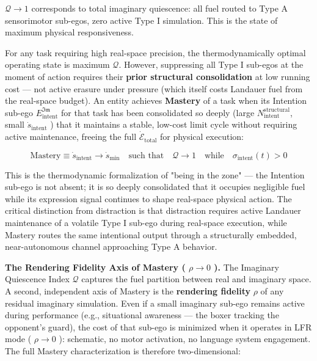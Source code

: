 \documentclass[11pt,a4paper]{article}
\theoremstyle{definition}
\theoremstyle{remark}
\begin{document}
$\mathcal{Q} \to 1$ corresponds to total imaginary quiescence: all fuel routed to Type A sensorimotor sub-egos, zero active Type I simulation. This is the state of maximum physical responsiveness.

For any task requiring high real-space precision, the thermodynamically optimal operating state is maximum $\mathcal{Q}$. However, suppressing all Type I sub-egos at the moment of action requires their \textbf{prior structural consolidation} at low running cost — not active erasure under pressure (which itself costs Landauer fuel from the real-space budget). An entity achieves \textbf{Mastery} of a task when its Intention sub-ego $E_{\text{intent}}^{\mathfrak{Im}}$ for that task has been consolidated so deeply (large $N_{\text{intent}}^{\text{structural}}$, small $\dot{s}_{\text{intent}}$ ) that it maintains a stable, low-cost limit cycle without requiring active maintenance, freeing the full $\dot{\mathcal{E}}_{\text{total}}$ for physical execution:


\begin{equation}
\boxed{\text{Mastery} \equiv \dot{s}_{\text{intent}} \to \dot{s}_{\text{min}} \quad \text{such that} \quad \mathcal{Q} \to 1 \quad \text{while} \quad \sigma_{\text{intent}}(t) > 0}
\end{equation}


This is the thermodynamic formalization of "being in the zone" — the Intention sub-ego is not absent; it is so deeply consolidated that it occupies negligible fuel while its expression signal continues to shape real-space physical action. The critical distinction from distraction is that distraction requires active Landauer maintenance of a volatile Type I sub-ego during real-space execution, while Mastery routes the same intentional output through a structurally embedded, near-autonomous channel approaching Type A behavior.

\textbf{The Rendering Fidelity Axis of Mastery ( $\rho \to 0$ ).} The Imaginary Quiescence Index $\mathcal{Q}$ captures the fuel partition between real and imaginary space. A second, independent axis of Mastery is the \textbf{rendering fidelity} $\rho$ of any residual imaginary simulation. Even if a small imaginary sub-ego remains active during performance (e.g., situational awareness — the boxer tracking the opponent's guard), the cost of that sub-ego is minimized when it operates in LFR mode ( $\rho \to 0$ ): schematic, no motor activation, no language system engagement. The full Mastery characterization is therefore two-dimensional:
\end{document}
